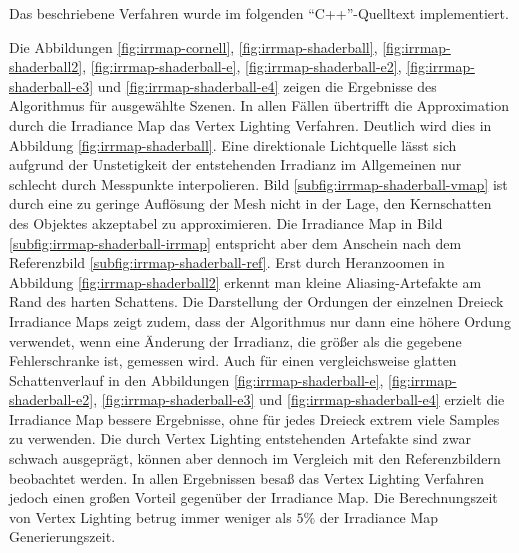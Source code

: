 		Das beschriebene Verfahren wurde im folgenden \enquote{C++}-Quelltext implementiert.

		

		Die Abbildungen \ref{fig:irrmap-cornell}, \ref{fig:irrmap-shaderball}, \ref{fig:irrmap-shaderball2}, \ref{fig:irrmap-shaderball-e}, \ref{fig:irrmap-shaderball-e2}, \ref{fig:irrmap-shaderball-e3} und \ref{fig:irrmap-shaderball-e4} zeigen die Ergebnisse des Algorithmus für ausgewählte Szenen.
		In allen Fällen übertrifft die Approximation durch die Irradiance Map das Vertex Lighting Verfahren.
		Deutlich wird dies in Abbildung \ref{fig:irrmap-shaderball}.
		Eine direktionale Lichtquelle lässt sich aufgrund der Unstetigkeit der entstehenden Irradianz im Allgemeinen nur schlecht durch Messpunkte interpolieren.
		Bild \ref{subfig:irrmap-shaderball-vmap} ist durch eine zu geringe Auflösung der Mesh nicht in der Lage, den Kernschatten des Objektes akzeptabel zu approximieren.
		Die Irradiance Map in Bild \ref{subfig:irrmap-shaderball-irrmap} entspricht aber dem Anschein nach dem Referenzbild \ref{subfig:irrmap-shaderball-ref}.
		Erst durch Heranzoomen in Abbildung \ref{fig:irrmap-shaderball2} erkennt man kleine Aliasing-Artefakte am Rand des harten Schattens.
		Die Darstellung der Ordungen der einzelnen Dreieck Irradiance Maps zeigt zudem, dass der Algorithmus nur dann eine höhere Ordung verwendet, wenn eine Änderung der Irradianz, die größer als die gegebene Fehlerschranke ist, gemessen wird.
		Auch für einen vergleichsweise glatten Schattenverlauf in den Abbildungen \ref{fig:irrmap-shaderball-e}, \ref{fig:irrmap-shaderball-e2}, \ref{fig:irrmap-shaderball-e3} und \ref{fig:irrmap-shaderball-e4} erzielt die Irradiance Map bessere Ergebnisse, ohne für jedes Dreieck extrem viele Samples zu verwenden.
		Die durch Vertex Lighting entstehenden Artefakte sind zwar schwach ausgeprägt, können aber dennoch im Vergleich mit den Referenzbildern beobachtet werden.
		In allen Ergebnissen besaß das Vertex Lighting Verfahren jedoch einen großen Vorteil gegenüber der Irradiance Map.
		Die Berechnungszeit von Vertex Lighting betrug immer weniger als $5\unit{\%}$ der Irradiance Map Generierungszeit.

